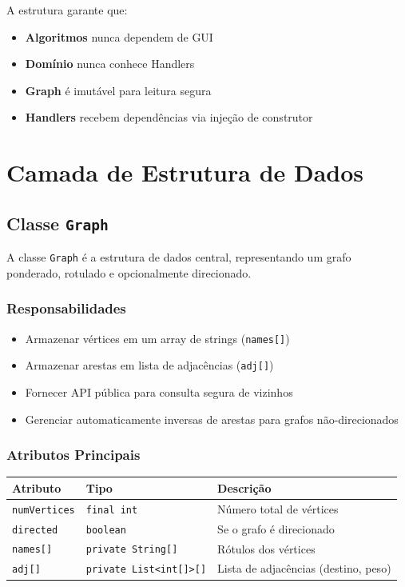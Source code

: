 \documentclass[12pt,a4paper]{article}
\begin{document}
A estrutura garante que:
\begin{itemize}
    \item \textbf{Algoritmos} nunca dependem de GUI
    \item \textbf{Domínio} nunca conhece Handlers
    \item \textbf{Graph} é imutável para leitura segura
    \item \textbf{Handlers} recebem dependências via injeção de construtor
\end{itemize}

\newpage

\section{Camada de Estrutura de Dados}

\subsection{Classe \texttt{Graph}}

A classe \texttt{Graph} é a estrutura de dados central, representando um grafo ponderado, rotulado e opcionalmente direcionado.

\subsubsection{Responsabilidades}

\begin{itemize}
    \item Armazenar vértices em um array de strings (\texttt{names[]})
    \item Armazenar arestas em lista de adjacências (\texttt{adj[]})
    \item Fornecer API pública para consulta segura de vizinhos
    \item Gerenciar automaticamente inversas de arestas para grafos não-direcionados
\end{itemize}

\subsubsection{Atributos Principais}

\begin{table}[h]
\centering
\begin{tabular}{|l|l|l|}
\hline
\textbf{Atributo} & \textbf{Tipo} & \textbf{Descrição} \\
\hline
\texttt{numVertices} & \texttt{final int} & Número total de vértices \\
\hline
\texttt{directed} & \texttt{boolean} & Se o grafo é direcionado \\
\hline
\texttt{names[]} & \texttt{private String[]} & Rótulos dos vértices \\
\hline
\texttt{adj[]} & \texttt{private List<int[]>[]} & Lista de adjacências (destino, peso) \\
\hline
\end{tabular}
\end{table}
\end{document}
